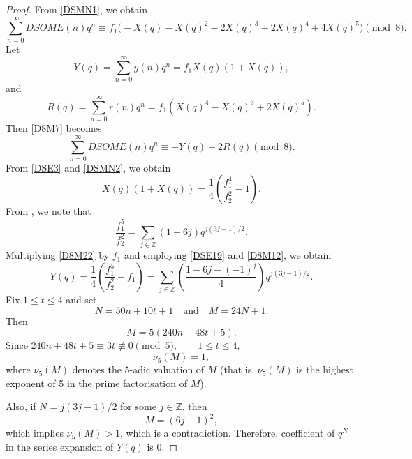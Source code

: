 \documentclass[12pt]{article}
\numberwithin{equation}{section}
\theoremstyle{definition}
\theoremstyle{remark}
\numberwithin{equation}{section}
\begin{document}
\begin{proof}
From \eqref{DSMN1}, we obtain
\begin{equation}\label{D8M7}
\sum_{n=0}^{\infty}DSOME(n)q^n\equiv
f_1\bigl(
-X(q)-X(q)^2-2X(q)^3
+2X(q)^4+4X(q)^5
\bigr)
\pmod{8}.
\end{equation}
Let
$$Y(q)=\sum_{n=0}^{\infty}y(n)q^n=f_1X(q)(1+X(q)),$$
and
\begin{equation}\label{D8M9}
R(q)=\sum_{n=0}^{\infty}r(n)q^n=f_1\left(X(q)^4-X(q)^3+2X(q)^5\right).
\end{equation}
Then \eqref{D8M7} becomes
$$\sum_{n=0}^{\infty}DSOME(n)q^n
\equiv -Y(q)+2R(q)\pmod{8}.$$
From \eqref{DSE3} and \eqref{DSMN2}, we obtain
\begin{equation}\label{D8M22}
X(q)(1+X(q))
=\dfrac{1}{4}
\left(
\dfrac{f_1^4}{f_2^2}-1
\right).
\end{equation}
From  \cite[(10.7.3)]{md}, we note that
\begin{equation}\label{D8M12}
\dfrac{f_1^5}{f_2^2}
=
\sum_{j\in\mathbb Z}(1-6j)
q^{j(3j-1)/2}.
\end{equation}
Multiplying \eqref{D8M22} by $f_1$ and employing
\eqref{DSE19} and \eqref{D8M12}, we obtain
\begin{equation*}
Y(q)
=\dfrac{1}{4}
\left(
\dfrac{f_1^5}{f_2^2}-f_1
\right)=
\sum_{j\in\mathbb Z}
\left(\dfrac{1-6j-(-1)^j}{4}\right)
q^{j(3j-1)/2}.
\end{equation*}
Fix $1\leq t\leq4$ and set
\begin{equation}\label{D8M26}
N=50n+10t+1
\quad\mbox{and}\quad
M=24N+1.
\end{equation}
Then
\begin{equation}\label{D8M27}
M
=5(240n+48t+5).
\end{equation}
Since
$240n+48t+5\equiv3t\not\equiv0\pmod{5},
\qquad 1\leq t\leq4,$
\begin{equation}\label{D8M29}
\nu_5(M)=1,
\end{equation}
where $\nu_5(M)$ denotes the $5$-adic valuation of $M$ (that is, $\nu_5(M)$ is the highest exponent of 5 in the prime factorisation of  $M$).

Also, if $N=j(3j-1)/2$ for some $j\in\mathbb Z$, then
\begin{equation*}
M
=(6j-1)^2, 
\end{equation*}
 which implies $\nu_5(M)>1$, which is a contradiction. Therefore, coefficient of $q^N$ in the series expansion of $Y(q)$ is $0$.
 

\end{proof}
\end{document}
